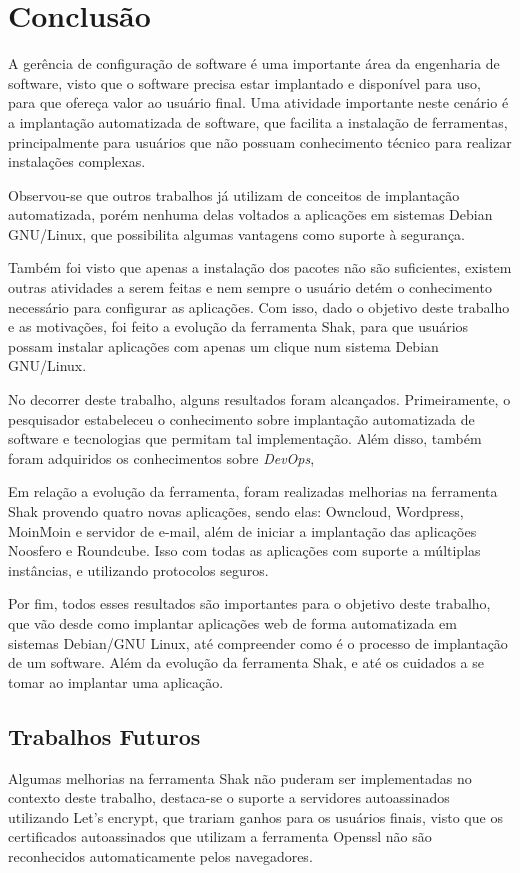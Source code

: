 \chapter{Conclusão}
\label{cap-conclusoes}

A gerência de configuração de software é uma importante área da engenharia de software,
visto que o software precisa estar implantado e disponível para uso, para que ofereça
valor ao usuário final. Uma atividade importante neste cenário é a implantação
automatizada de software, que facilita a instalação de ferramentas, principalmente
para usuários que não possuam conhecimento técnico para realizar instalações complexas.

Observou-se que outros trabalhos já utilizam de conceitos de implantação automatizada,
porém nenhuma delas voltados a aplicações em sistemas Debian GNU/Linux, que possibilita
algumas vantagens como suporte à segurança.
 
Também foi visto que apenas a instalação dos pacotes não são suficientes,
existem outras atividades a serem feitas e nem sempre o usuário detém
o conhecimento necessário para configurar as aplicações. Com isso, dado o objetivo
deste trabalho e as motivações, foi feito a evolução da ferramenta Shak, para
que usuários possam instalar aplicações com apenas um clique num sistema Debian
GNU/Linux.

No decorrer deste trabalho, alguns resultados foram alcançados. Primeiramente, o
pesquisador estabeleceu o conhecimento sobre implantação automatizada
de software e tecnologias que permitam tal implementação. Além disso, 
também foram adquiridos os conhecimentos sobre \textit{DevOps}, 
 
Em relação a evolução da ferramenta, foram realizadas melhorias na ferramenta Shak
provendo quatro novas aplicações, sendo elas: Owncloud, Wordpress, MoinMoin e
servidor de e-mail, além de iniciar a implantação das aplicações Noosfero e Roundcube. Isso
com todas as aplicações com suporte a múltiplas instâncias, e utilizando protocolos seguros.

Por fim, todos esses resultados são importantes para o objetivo deste trabalho, que vão
desde como implantar aplicações web de forma automatizada em sistemas Debian/GNU Linux, 
até compreender como é o processo de implantação de um software. Além da evolução
da ferramenta Shak, e até os cuidados a se tomar ao implantar uma aplicação.
 
\section{Trabalhos Futuros}
%
Algumas melhorias na ferramenta Shak não puderam ser implementadas no contexto
deste trabalho, destaca-se o suporte a servidores autoassinados utilizando
Let's encrypt, que trariam ganhos para os usuários finais, visto que os certificados
autoassinados que utilizam a ferramenta Openssl não são reconhecidos automaticamente
pelos navegadores. 

